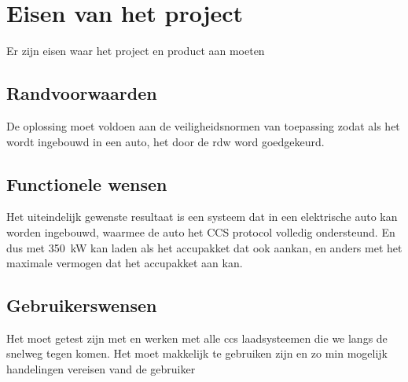 \chapter{Eisen van het project}
\label{Eisen_van_het_project}

Er zijn eisen waar het project en product aan moeten 

\section{Randvoorwaarden}

De oplossing moet voldoen aan de veiligheidsnormen van toepassing zodat als het
wordt ingebouwd in een auto, het door de \ac{rdw} word goedgekeurd.

\section{Functionele wensen}

Het uiteindelijk gewenste resultaat is een systeem dat in een elektrische auto
kan worden ingebouwd, waarmee de auto het CCS protocol volledig ondersteund. En
dus met \si{350\kilo\watt} kan laden als het accupakket dat ook aankan, en
anders met het maximale vermogen dat het accupakket aan kan.

\section{Gebruikerswensen}

Het moet getest zijn met en werken met alle ccs laadsysteemen die we langs de
snelweg tegen komen. Het moet makkelijk te gebruiken zijn en zo min mogelijk
handelingen vereisen vand de gebruiker

